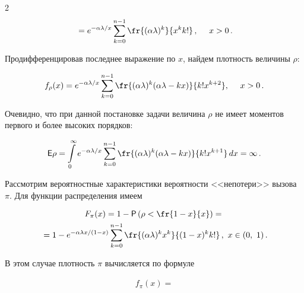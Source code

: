 \begin{multicols}{2}
\begin{multline*}
{}= e^{-\alpha\lambda/x}\sum_{k=0}^{n-1}\fr{(\alpha\lambda)^k}{x^k k!}\,,\ \ \ \ x>0\,.


\end{multline*}





Продифференцировав последнее выражение по $x$, найдем плотность величины $\rho$:


$$


f_\rho(x)=


e^{-\alpha\lambda/x}\sum_{k=0}^{n-1}\fr{(\alpha\lambda)^k(\alpha\lambda-kx)}{k!x^{k+2}},\ \ \ \ x>0\,.


$$





Очевидно, что при данной постановке задачи величина $\rho$ не имеет моментов первого и более высоких порядков:


$$


\e\rho=\il{0}{\infty}e^{-\alpha\lambda/x}


\sum_{k=0}^{n-1}\fr{(\alpha\lambda)^k(\alpha\lambda-kx)}{k!x^{k+1}}\,dx=\infty\,.


$$





Рассмотрим вероятностные характеристики вероятности <<непотери>> вызова $\pi$. Для функции распределения имеем


\begin{multline*}


F_\pi(x)=1-\p\left(\rho<\fr{1-x}{x}\right)={}\\


{}= 1-e^{-\alpha\lambda x/ (1-x)}\sum_{k=0}^{n-1}\fr{(\alpha\lambda)^k x^k}{(1-x)^k k!}\,,


\ x\in(0,\ 1)\,.


\end{multline*}





В этом случае плотность $\pi$ вычисляется по формуле







\noindent




{\begin{multline*}


f_\pi(x)={}\\



\end{multline*}}
\end{multicols}
